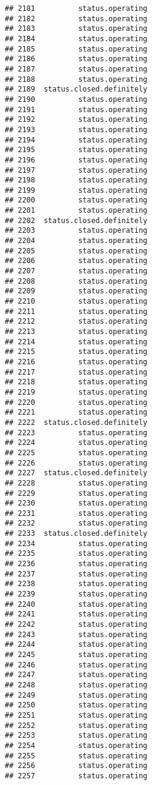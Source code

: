 \documentclass[
]{article}
\begin{document}
\begin{verbatim}
## 2181          status.operating
## 2182          status.operating
## 2183          status.operating
## 2184          status.operating
## 2185          status.operating
## 2186          status.operating
## 2187          status.operating
## 2188          status.operating
## 2189  status.closed.definitely
## 2190          status.operating
## 2191          status.operating
## 2192          status.operating
## 2193          status.operating
## 2194          status.operating
## 2195          status.operating
## 2196          status.operating
## 2197          status.operating
## 2198          status.operating
## 2199          status.operating
## 2200          status.operating
## 2201          status.operating
## 2202  status.closed.definitely
## 2203          status.operating
## 2204          status.operating
## 2205          status.operating
## 2206          status.operating
## 2207          status.operating
## 2208          status.operating
## 2209          status.operating
## 2210          status.operating
## 2211          status.operating
## 2212          status.operating
## 2213          status.operating
## 2214          status.operating
## 2215          status.operating
## 2216          status.operating
## 2217          status.operating
## 2218          status.operating
## 2219          status.operating
## 2220          status.operating
## 2221          status.operating
## 2222  status.closed.definitely
## 2223          status.operating
## 2224          status.operating
## 2225          status.operating
## 2226          status.operating
## 2227  status.closed.definitely
## 2228          status.operating
## 2229          status.operating
## 2230          status.operating
## 2231          status.operating
## 2232          status.operating
## 2233  status.closed.definitely
## 2234          status.operating
## 2235          status.operating
## 2236          status.operating
## 2237          status.operating
## 2238          status.operating
## 2239          status.operating
## 2240          status.operating
## 2241          status.operating
## 2242          status.operating
## 2243          status.operating
## 2244          status.operating
## 2245          status.operating
## 2246          status.operating
## 2247          status.operating
## 2248          status.operating
## 2249          status.operating
## 2250          status.operating
## 2251          status.operating
## 2252          status.operating
## 2253          status.operating
## 2254          status.operating
## 2255          status.operating
## 2256          status.operating
## 2257          status.operating

\end{verbatim}
\end{document}
